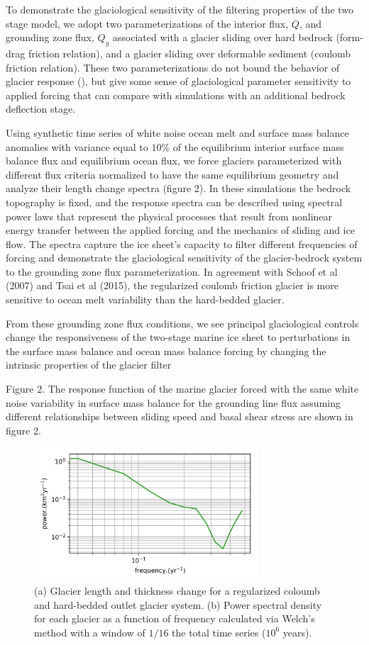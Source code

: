 \documentclass[tc, manuscript]{copernicus}
\begin{document}
To demonstrate the glaciological sensitivity of the filtering properties of the two stage model, we adopt two parameterizations of the interior flux, $Q$, and grounding zone flux, $Q_g$ associated with a glacier sliding over hard bedrock (form-drag friction relation), and a glacier sliding over deformable sediment (coulomb friction relation). These two parameterizations do not bound the behavior of glacier response (), but give some sense of glaciological parameter sensitivity to applied forcing that can compare with simulations with an additional bedrock deflection stage.

Using synthetic time series of white noise ocean melt and surface mass balance anomalies with variance equal to $10\%$ of the equilibrium interior surface mass balance flux and equilibrium ocean flux, we force glaciers parameterized with different flux criteria normalized to have the same equilibrium geometry and analyze their length change spectra (figure 2).
In these simulations the bedrock topography is fixed, and the response spectra can be described using spectral power laws that represent the physical processes that result from nonlinear energy transfer between the applied forcing and the mechanics of sliding and ice flow.
The spectra capture the ice sheet’s capacity to filter different frequencies of forcing and demonstrate the glaciological sensitivity of the glacier-bedrock system to the grounding zone flux parameterization.
In agreement with Schoof et al (2007) and Tsai et al (2015), the regularized coulomb friction glacier is more sensitive to ocean melt variability than the hard-bedded glacier. 

From these grounding zone flux conditions, we see principal glaciological controls change the responsiveness of the two-stage marine ice sheet to perturbations in the surface mass balance and ocean mass balance forcing by changing the intrinsic properties of the glacier filter

Figure 2. The response function of the marine glacier forced with the same white noise variability in surface mass balance for the grounding line flux assuming different relationships between sliding speed and basal shear stress are shown in figure 2.



\begin{figure}[t]
\includegraphics[width=8.3cm]{../figures/simulation0203.png}
\caption{(a) Glacier length and thickness change for a regularized coloumb and hard-bedded outlet glacier system. (b) Power spectral density for each glacier as a function of frequency calculated via Welch's method with a window of $1/16$ the total time series ($10^6$ years).}
\end{figure}
\end{document}
